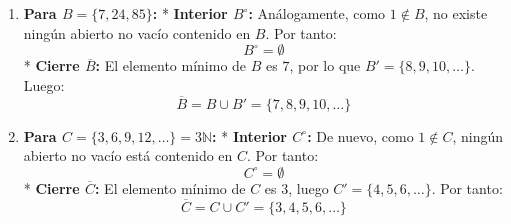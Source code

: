\begin{sol}
\begin{enumerate}[label=\arabic*)]
        \medskip

        \item \textbf{Para $B = \{7, 24, 85\}$:}
        * \textbf{Interior $B^\circ$:} Análogamente, como $1 \notin B$, no existe ningún abierto no vacío contenido en $B$. Por tanto:
          \[ B^\circ = \emptyset \]
        * \textbf{Cierre $\overline{B}$:} El elemento mínimo de $B$ es $7$, por lo que $B' = \{8, 9, 10, \dots\}$. Luego:
          \[ \overline{B} = B \cup B' = \{7, 8, 9, 10, \dots\} \]

        \medskip

        \item \textbf{Para $C = \{3, 6, 9, 12, \dots\} = 3\mathbb{N}$:}
        * \textbf{Interior $C^\circ$:} De nuevo, como $1 \notin C$, ningún abierto no vacío está contenido en $C$. Por tanto:
          \[ C^\circ = \emptyset \]
        * \textbf{Cierre $\overline{C}$:} El elemento mínimo de $C$ es $3$, luego $C' = \{4, 5, 6, \dots\}$. Por tanto:
          \[ \overline{C} = C \cup C' = \{3, 4, 5, 6, \dots\} \]
    \end{enumerate}
\end{sol}
